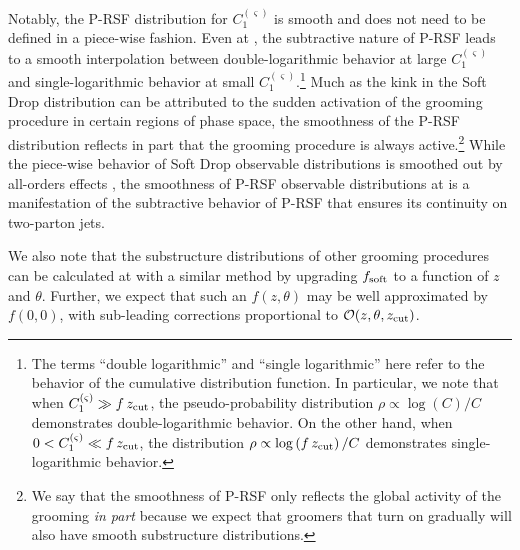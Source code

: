 Notably, the P-RSF distribution for \(C_1^{(\varsigma)}\) is smooth and does not need to be defined in a piece-wise fashion.
%
Even at , the subtractive nature of P-RSF leads to a smooth interpolation between double-logarithmic behavior at large \(C_1^{(\varsigma)}\) and single-logarithmic behavior at small \(C_1^{(\varsigma)}\).\footnote{The terms ``double logarithmic'' and ``single logarithmic'' here refer to the behavior of the  cumulative distribution function.
%
In particular, we note that when \(C_1^{(\varsigma)} \gg f\,z_{\rm cut}\), the pseudo-probability distribution \(\rho \propto \log\left(C\right)/C\) demonstrates double-logarithmic behavior.
%
On the other hand, when \(0 < C_1^{(\varsigma)} \ll f\,z_{\rm cut}\), the distribution \(\rho \propto \log\left(f\,z_{\rm cut}\right)/C\) demonstrates single-logarithmic behavior.
}
%
Much as the kink in the Soft Drop distribution can be attributed to the sudden activation of the grooming procedure in certain regions of phase space, the smoothness of the P-RSF distribution reflects in part that the grooming procedure is always active.\footnote{
We say that the smoothness of P-RSF only reflects the global activity of the grooming \textit{in part} because we expect that \PIRANHA{} groomers that turn on gradually will also have smooth substructure distributions.}
%
While the piece-wise behavior of Soft Drop observable distributions is smoothed out by all-orders effects \cite{Benkendorfer:2021unv}, the smoothness of P-RSF observable distributions at  is a manifestation of the subtractive behavior of P-RSF that ensures its continuity on two-parton jets.

We also note that the substructure distributions of other \PIRANHA{} grooming procedures can be calculated at  with a similar method by upgrading \(f_{\rm soft}\) to a function of \(z\) and \(\theta\).
%
Further, we expect that such an \(f(z, \theta)\) may be well approximated by \(f(0,0)\), with sub-leading corrections proportional to \(\mathcal{O}(z, \theta, z_{\rm cut})\).


